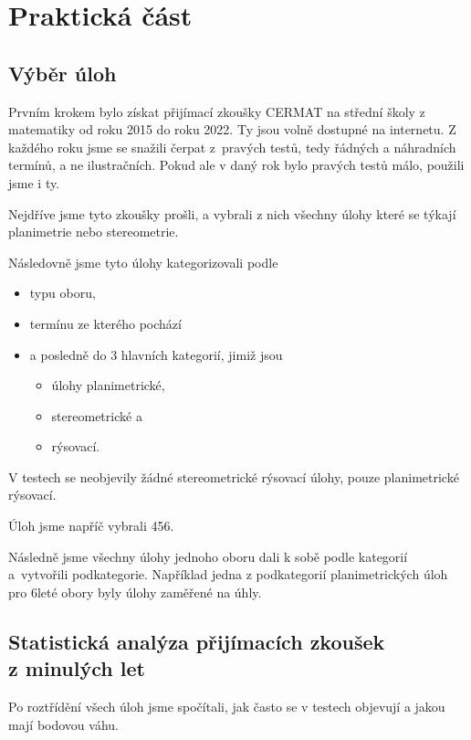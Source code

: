 \chapter{Praktická část}


\section{Výběr úloh}

Prvním krokem bylo získat přijímací zkoušky CERMAT na střední školy z matematiky od roku 2015 do roku 2022. Ty jsou volně dostupné na internetu. Z každého roku jsme se snažili čerpat z~pravých testů, tedy řádných a náhradních termínů, a ne ilustračních. Pokud ale v daný rok bylo pravých testů málo, použili jsme i ty.

Nejdříve jsme tyto zkoušky prošli, a vybrali z nich všechny úlohy které se týkají planimetrie nebo stereometrie.

Následovně jsme tyto úlohy kategorizovali podle
\begin{itemize}
    \item typu oboru,
    \item termínu ze kterého pochází
    \item a posledně do 3 hlavních kategorií, jimiž jsou
    \begin{itemize}
        \item úlohy planimetrické,
        \item stereometrické a
        \item rýsovací.
    \end{itemize}
\end{itemize}

V testech se neobjevily žádné stereometrické rýsovací úlohy, pouze planimetrické rýsovací.

Úloh jsme napříč vybrali 456.

Následně jsme všechny úlohy jednoho oboru dali k sobě podle kategorií a~vytvořili podkategorie. Například jedna z podkategorií planimetrických úloh pro 6leté obory byly úlohy zaměřené na úhly.


\section[Statistická analýza přijímacích zkoušek z minulých let]{Statistická analýza přijímacích zkoušek\\z minulých let}

Po roztřídění všech úloh jsme spočítali, jak často se v testech objevují a jakou mají bodovou váhu.

